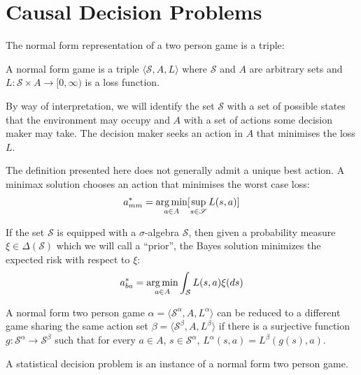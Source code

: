 \section{Causal Decision Problems}

The normal form representation of a two person game is a triple:

\begin{definition}
A normal form game is a triple $\langle \mathscr{S}, A, L\rangle$ where $\mathscr{S}$ and $A$ are arbitrary sets and $L:\mathscr{S}\times A\to [0,\infty)$ is a loss function.

By way of interpretation, we will identify the set $\mathscr{S}$ with a set of possible states that the environment may occupy and $A$ with a set of actions some decision maker may take. The decision maker seeks an action in $A$ that minimises the loss $L$.
\end{definition}

The definition presented here does not generally admit a unique best action. A minimax solution chooses an action that minimises the worst case loss:
\begin{align}
    a^*_{mm} = \operatorname*{arg\,min}_{a\in A} [\sup_{s\in \mathscr{S}} L(s,a)]\label{eq:mm_soln}
\end{align}

If the set $\mathscr{S}$ is equipped with a $\sigma$-algebra $\mathcal{S}$, then given a probability measure $\xi\in \Delta(\mathcal{S})$ which we will call a ``prior'', the Bayes solution minimizes the expected risk with respect to $\xi$:
\begin{align}
    a^*_{ba} = \operatorname*{arg\,min}_{a\in A} \int_{\mathcal{S}} L(s,a) \xi(ds) \label{eq:ba_soln}
\end{align}

\begin{definition}[Reduction]\label{def:red_sdp_cdp}
A normal form two person game $\alpha = \langle \mathscr{S}^\alpha, A, L^\alpha\rangle$ can be reduced to a different game sharing the same action set $\beta = \langle \mathscr{S}^\beta, A, L^\beta \rangle$ if there is a surjective function $g:\mathscr{S}^\alpha\to \mathscr{S}^\beta$ such that for every $a\in A$, $s\in \mathscr{S}^\alpha$, $L^\alpha(s,a) = L^\beta(g(s),a)$.
\end{definition}

A statistical decision problem is an instance of a normal form two person game.

